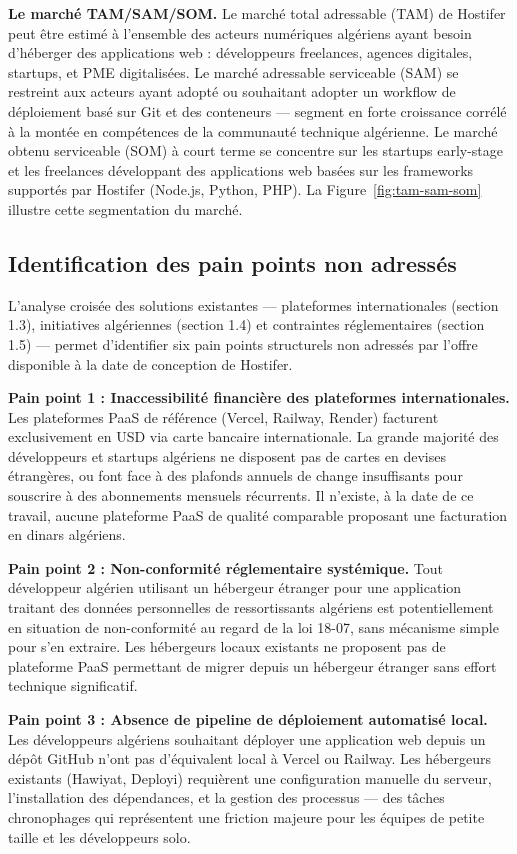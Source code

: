 \textbf{Le marché TAM/SAM/SOM.} Le marché total adressable (TAM) de Hostifer peut être estimé à l'ensemble des acteurs numériques algériens ayant besoin d'héberger des applications web : développeurs freelances, agences digitales, startups, et PME digitalisées. Le marché adressable serviceable (SAM) se restreint aux acteurs ayant adopté ou souhaitant adopter un workflow de déploiement basé sur Git et des conteneurs — segment en forte croissance corrélé à la montée en compétences de la communauté technique algérienne. Le marché obtenu serviceable (SOM) à court terme se concentre sur les startups early-stage et les freelances développant des applications web basées sur les frameworks supportés par Hostifer (Node.js, Python, PHP). La Figure~\ref{fig:tam-sam-som} illustre cette segmentation du marché.

\subsection*{Identification des pain points non adressés}

L'analyse croisée des solutions existantes — plateformes internationales (section 1.3), initiatives algériennes (section 1.4) et contraintes réglementaires (section 1.5) — permet d'identifier six pain points structurels non adressés par l'offre disponible à la date de conception de Hostifer.

\textbf{Pain point 1 : Inaccessibilité financière des plateformes internationales.} Les plateformes PaaS de référence (Vercel, Railway, Render) facturent exclusivement en USD via carte bancaire internationale. La grande majorité des développeurs et startups algériens ne disposent pas de cartes en devises étrangères, ou font face à des plafonds annuels de change insuffisants pour souscrire à des abonnements mensuels récurrents. Il n'existe, à la date de ce travail, aucune plateforme PaaS de qualité comparable proposant une facturation en dinars algériens.

\textbf{Pain point 2 : Non-conformité réglementaire systémique.} Tout développeur algérien utilisant un hébergeur étranger pour une application traitant des données personnelles de ressortissants algériens est potentiellement en situation de non-conformité au regard de la loi 18-07, sans mécanisme simple pour s'en extraire. Les hébergeurs locaux existants ne proposent pas de plateforme PaaS permettant de migrer depuis un hébergeur étranger sans effort technique significatif.

\textbf{Pain point 3 : Absence de pipeline de déploiement automatisé local.} Les développeurs algériens souhaitant déployer une application web depuis un dépôt GitHub n'ont pas d'équivalent local à Vercel ou Railway. Les hébergeurs existants (Hawiyat, Deployi) requièrent une configuration manuelle du serveur, l'installation des dépendances, et la gestion des processus — des tâches chronophages qui représentent une friction majeure pour les équipes de petite taille et les développeurs solo.

